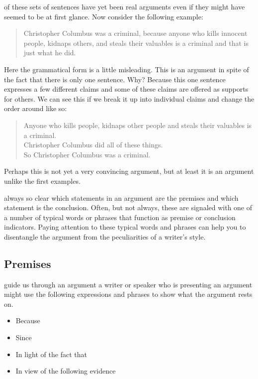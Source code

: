 \documentclass[justified]{tufte-book}
\providecommand{\tightlist}{%
  \setlength{\itemsep}{0pt}\setlength{\parskip}{0pt}}
\newenvironment{argument}{\begin{quote}\normalsize}{\end{quote}}
\begin{document}
 of these sets of sentences have yet been real arguments even if they might have seemed to be at first glance. Now consider the following example:

\begin{argument}
Christopher Columbus was a criminal, because anyone who kills innocent
people, kidnaps others, and steals their valuables is a criminal and
that is just what he did.
\end{argument}

Here the grammatical form is a little misleading. This is an argument in spite of the fact that there is only one sentence. Why? Because this one sentence expresses a few different claims and some of these claims are offered as supports for others. We can see this if we break it up into individual claims and change the order around like so:

\begin{argument}
Anyone who kills people, kidnaps other people and steals their valuables
is a criminal.\\
Christopher Columbus did all of these things.\\

So Christopher Columbus was a criminal.
\end{argument}

Perhaps this is not yet a very convincing argument, but at least it is an argument unlike the first examples.

 always so clear which statements in an argument are the premises and which statement is the conclusion. Often, but not always, these are signaled with one of a number of typical words or phrases that function as premise or conclusion indicators. Paying attention to these typical words and phrases can help you to disentangle the argument from the peculiarities of a writer's style.

\hypertarget{premises}{%
\subsection*{Premises}\label{premises}}

 guide us through an argument a writer or speaker who is presenting an argument might use the following expressions and phrases to show what the argument rests on.

\begin{itemize}
\tightlist
\item
  Because
\item
  Since
\item
  In light of the fact that
\item
  In view of the following evidence
\end{itemize}
\end{document}
